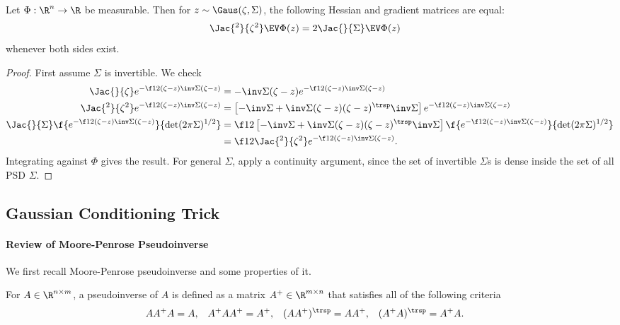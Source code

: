 \documentclass[main.tex]{subfiles}
\begin{document}
\begin{lemma}\label{lemma:gaussianDer}
Let $\Phi: \R^n \to \R$ be measurable.
Then for $z \sim \Gaus(\zeta, \Sigma)$, the following Hessian and gradient matrices are equal:
\begin{align*}
    \Jac{^2}{\zeta^2} \EV \Phi(z)
        &=
            2\Jac{}{\Sigma} \EV \Phi(z)
\end{align*}
whenever both sides exist.
\end{lemma}
\begin{proof}
First assume $\Sigma$ is invertible.
We check
\begin{align*}
    \Jac{}{\zeta} e^{-\f 1 2 (\zeta-z)\inv \Sigma (\zeta-z)}
        &=
            - \inv \Sigma (\zeta - z)
            e^{-\f 1 2 (\zeta-z)\inv \Sigma (\zeta-z)}
            \\
    \Jac{^2}{\zeta^2} e^{-\f 1 2 (\zeta-z)\inv \Sigma (\zeta-z)}
        &=
            \left[
                - \inv \Sigma
                + \inv \Sigma (\zeta-z) (\zeta-z)^\trsp \inv \Sigma
            \right]
            e^{-\f 1 2 (\zeta-z)\inv \Sigma (\zeta-z)}
            \\
    \Jac{}{\Sigma} \f{e^{-\f 1 2 (\zeta-z)\inv \Sigma (\zeta-z)}}{
                    \det(2\pi \Sigma)^{1/2}}
        &=
            \f 1 2 \left[
                - \inv \Sigma
                + \inv \Sigma (\zeta-z) (\zeta-z)^\trsp \inv \Sigma
            \right]
            \f{e^{-\f 1 2 (\zeta-z)\inv \Sigma (\zeta-z)}}{
                    \det(2\pi \Sigma)^{1/2}}
            \\
        &=
            \f 1 2
            \Jac{^2}{\zeta^2} e^{-\f 1 2 (\zeta-z)\inv \Sigma (\zeta-z)}
            .
\end{align*}
Integrating against $\Phi$ gives the result.
For general $\Sigma$, apply a continuity argument, since the set of invertible $\Sigma$s is dense inside the set of all PSD $\Sigma$.
\end{proof}

\subsection{Gaussian Conditioning Trick}

\paragraph{Review of Moore-Penrose Pseudoinverse}

We first recall Moore-Penrose pseudoinverse and some properties of it.
\begin{defn}\label{defn:pseuodoinverse}
For $A \in \R^{n \times m}$, a pseudoinverse of $A$ is defined as a matrix $A^+ \in \R^{m \times n}$ that satisfies all of the following criteria
\begin{align*}
  A A^+ A &= A,&
  A^+ A A^+ &= A^+,&
  (AA^+)^\trsp &= AA^+,&
  (A^+ A)^\trsp &= A^+ A
  .
\end{align*}
\end{defn}
\end{document}
